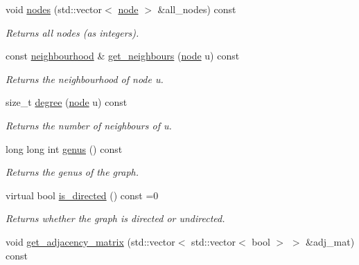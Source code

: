 \begin{DoxyCompactItemize}
\mbox{\label{classlgraph_1_1xxgraph_a9a24f0e1c0c40abc505e35d0dd9bf10a}} 
void \hyperlink{classlgraph_1_1xxgraph_a9a24f0e1c0c40abc505e35d0dd9bf10a}{nodes} (std\+::vector$<$ \hyperlink{namespacelgraph_a397169dd66adf725210a30fb7251773e}{node} $>$ \&all\+\_\+nodes) const
\begin{DoxyCompactList}\small\item\em Returns all nodes (as integers). \end{DoxyCompactList}\item 
const \hyperlink{namespacelgraph_a052e7766c13f3a43cec0aec8173fdede}{neighbourhood} \& \hyperlink{classlgraph_1_1xxgraph_a745a535506115c66ce0993ef7e7759ba}{get\+\_\+neighbours} (\hyperlink{namespacelgraph_a397169dd66adf725210a30fb7251773e}{node} u) const
\begin{DoxyCompactList}\small\item\em Returns the neighbourhood of node u. \end{DoxyCompactList}\item 
size\+\_\+t \hyperlink{classlgraph_1_1xxgraph_a20ebc2927ee8fb8bb0a2c3b448d9ed78}{degree} (\hyperlink{namespacelgraph_a397169dd66adf725210a30fb7251773e}{node} u) const
\begin{DoxyCompactList}\small\item\em Returns the number of neighbours of u. \end{DoxyCompactList}\item 
long long int \hyperlink{classlgraph_1_1xxgraph_a5f48a91046766e3e0b71a3326f2b9153}{genus} () const
\begin{DoxyCompactList}\small\item\em Returns the genus of the graph. \end{DoxyCompactList}\item 
virtual bool \hyperlink{classlgraph_1_1xxgraph_a0a606d77cbbb2efa7056b82c3b8c395c}{is\+\_\+directed} () const =0
\begin{DoxyCompactList}\small\item\em Returns whether the graph is directed or undirected. \end{DoxyCompactList}\item 
\mbox{\label{classlgraph_1_1xxgraph_a8108bac3649acfae39a45e6de2b339b6}} 
void \hyperlink{classlgraph_1_1xxgraph_a8108bac3649acfae39a45e6de2b339b6}{get\+\_\+adjacency\+\_\+matrix} (std\+::vector$<$ std\+::vector$<$ bool $>$ $>$ \&adj\+\_\+mat) const

\end{DoxyCompactItemize}
